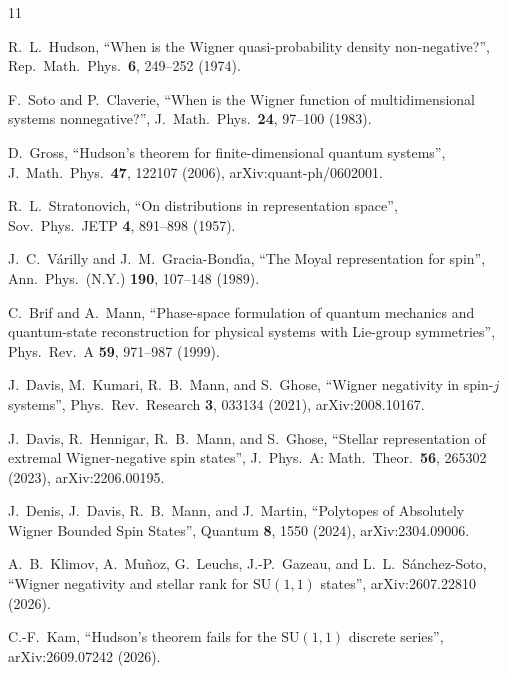 \documentclass[11pt,a4paper]{article}
\theoremstyle{remark}
\begin{document}
\begin{thebibliography}{11}

R.~L.~Hudson, ``When is the Wigner quasi-probability density non-negative?'', Rep.\ Math.\ Phys.\ \textbf{6}, 249--252 (1974).

F.~Soto and P.~Claverie, ``When is the Wigner function of multidimensional systems nonnegative?'', J.\ Math.\ Phys.\ \textbf{24}, 97--100 (1983).

D.~Gross, ``Hudson's theorem for finite-dimensional quantum systems'', J.\ Math.\ Phys.\ \textbf{47}, 122107 (2006), arXiv:quant-ph/0602001.

R.~L.~Stratonovich, ``On distributions in representation space'', Sov.\ Phys.\ JETP \textbf{4}, 891--898 (1957).

J.~C.~V\'arilly and J.~M.~Gracia-Bond\'{\i}a, ``The Moyal representation for spin'', Ann.\ Phys.\ (N.Y.) \textbf{190}, 107--148 (1989).

C.~Brif and A.~Mann, ``Phase-space formulation of quantum mechanics and quantum-state reconstruction for physical systems with Lie-group symmetries'', Phys.\ Rev.\ A \textbf{59}, 971--987 (1999).

J.~Davis, M.~Kumari, R.~B.~Mann, and S.~Ghose, ``Wigner negativity in spin-$j$ systems'', Phys.\ Rev.\ Research \textbf{3}, 033134 (2021), arXiv:2008.10167.

J.~Davis, R.~Hennigar, R.~B.~Mann, and S.~Ghose, ``Stellar representation of extremal Wigner-negative spin states'', J.\ Phys.\ A: Math.\ Theor.\ \textbf{56}, 265302 (2023), arXiv:2206.00195.

J.~Denis, J.~Davis, R.~B.~Mann, and J.~Martin, ``Polytopes of Absolutely Wigner Bounded Spin States'', Quantum \textbf{8}, 1550 (2024), arXiv:2304.09006.

A.~B.~Klimov, A.~Mu\~noz, G.~Leuchs, J.-P.~Gazeau, and L.~L.~S\'anchez-Soto, ``Wigner negativity and stellar rank for $\mathrm{SU}(1,1)$ states'', arXiv:2607.22810 (2026).

C.-F.~Kam, ``Hudson's theorem fails for the $\mathrm{SU}(1,1)$ discrete series'', arXiv:2609.07242 (2026).

\end{thebibliography}
\end{document}
